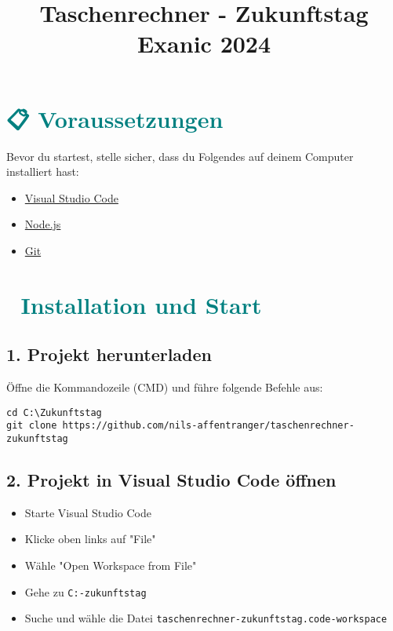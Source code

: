 \documentclass{article}
\title{\textbf{Taschenrechner - Zukunftstag Exanic 2024}}
\date{}
\begin{document}
\maketitle

\section*{\textcolor{teal}{📋 Voraussetzungen}}
Bevor du startest, stelle sicher, dass du Folgendes auf deinem Computer installiert hast:
\begin{itemize}
    \item \href{https://code.visualstudio.com/}{Visual Studio Code}
    \item \href{https://nodejs.org/en/download/prebuilt-binaries/}{Node.js}
    \item \href{https://gitforwindows.org/}{Git}
\end{itemize}

\section*{\textcolor{teal}{🚀 Installation und Start}}

\subsection*{1. Projekt herunterladen}
Öffne die Kommandozeile (CMD) und führe folgende Befehle aus:
\begin{verbatim}
cd C:\Zukunftstag
git clone https://github.com/nils-affentranger/taschenrechner-zukunftstag
\end{verbatim}

\subsection*{2. Projekt in Visual Studio Code öffnen}
\begin{itemize}
    \item Starte Visual Studio Code
    \item Klicke oben links auf "File"
    \item Wähle "Open Workspace from File"
    \item Gehe zu \texttt{C:\Zukunftstag\taschenrechner-zukunftstag}
    \item Suche und wähle die Datei \texttt{taschenrechner-zukunftstag.code-workspace}
\end{itemize}

\end{document}
